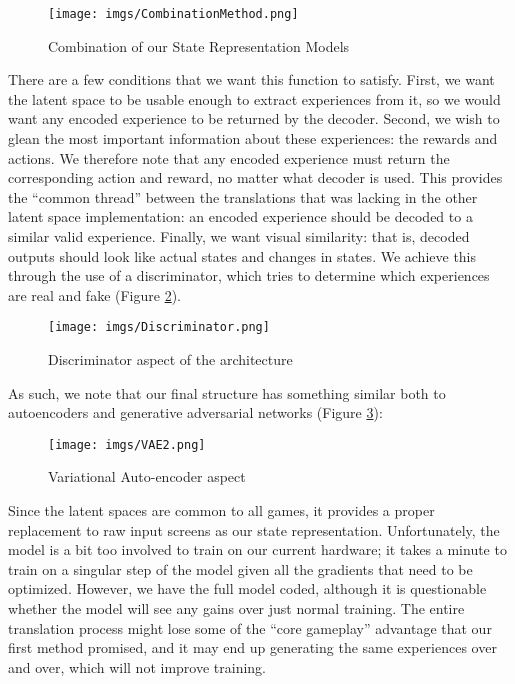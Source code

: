 \documentclass{article} %
\begin{document}
\begin{figure}[htpb]
  \centering
  \texttt{[image: imgs/CombinationMethod.png]}
  \caption{Combination of our State Representation Models}
  \label{fig:imgs-CombinationMethod-png}
\end{figure}

There are a few conditions that we want this function to satisfy. First, we want the latent space to
be usable enough to extract experiences from it, so we would want any encoded experience
to be returned by the decoder. Second, we wish to glean the most important
information about these experiences: the rewards and actions. We therefore note that any encoded
experience must return the corresponding action and reward, no matter what decoder is used. This
provides the ``common thread'' between the translations that was lacking in the other latent space
implementation: an encoded experience should be decoded to a similar valid experience. Finally, we
want visual similarity: that is, decoded outputs should look like actual states and changes in
states. We achieve this through the use of a discriminator, which tries to determine which
experiences are real and fake (Figure \ref{fig:imgs-Discriminator-png}). 

\begin{figure}[htpb]
  \centering
  \texttt{[image: imgs/Discriminator.png]}
  \caption{Discriminator aspect of the architecture}
  \label{fig:imgs-Discriminator-png}
\end{figure}

As such, we note that our final structure has something similar both to autoencoders and generative
adversarial networks (Figure \ref{fig:imgs-VAE-png}):

\begin{figure}[htpb]
  \centering
  \texttt{[image: imgs/VAE2.png]}
  \caption{Variational Auto-encoder aspect}
  \label{fig:imgs-VAE-png}
\end{figure}

Since the latent spaces are common to all games, it provides a proper replacement to raw input
screens as our state representation. Unfortunately, the model is a bit too involved to train on our
current hardware; it takes a minute to train on a singular step of the model given all the gradients
that need to be optimized. However, we have the full model coded, although it is questionable
whether the model will see any gains over just normal training. The entire translation process might
lose some of the ``core gameplay'' advantage that our first method promised, and it may end up
generating the same experiences over and over, which will not improve training.
\end{document}
